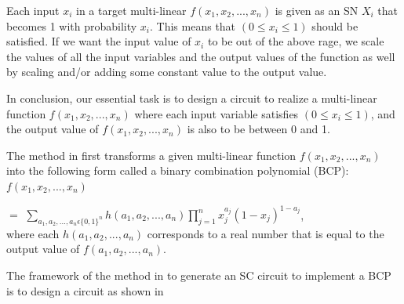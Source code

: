 \documentclass[10pt,conference]{IEEEtran}
\begin{document}
\par
Each input $x_i$ in a target multi-linear $f(x_1,x_2,...,x_n)$ is given as an SN $X_i$ that becomes 1 with probability $x_i$. This means that $(0 \leq  x_i \leq 1)$ should be satisfied. If we want the input value of $x_i$ to be out of the above rage, we scale the values of all the input variables and the output values of the function as well by scaling and/or adding some constant value to the output value.

\par
In conclusion, our essential task is to design a circuit to
realize a multi-linear function
$f(x_1,x_2,...,x_n)$ where each
input variable satisfies
$(0 \leq  x_i \leq 1)$, and the output value of
$f(x_1,x_2,...,x_n)$ is also to be between 0 and 1.

\par
The method in \cite{fifteen} first transforms a given multi-linear
function
$f(x_1,x_2,...,x_n)$ into the following form called a binary combination polynomial (BCP): \\ $f(x_1,x_2,...,x_n)$ \\ 
  \par $=$ \hspace{4mm}  $\sum_{a_1, a_2,...,a_n\epsilon \{{0,1}\}^{n}}h(a_1, a_2,...,a_n)\prod_{j=1}^{n}x_j^{a_j}(1-x_j)^{1-a_j}$, \\ where each $h(a_1,a_2,...,a_n)$ corresponds to a real number that is equal to the output value of $f(a_1,a_2,...,a_n)$. 
  \par 
  The framework of the method in \cite{fifteen} to generate an SC circuit to implement a BCP is to design a circuit as shown in
\end{document}
